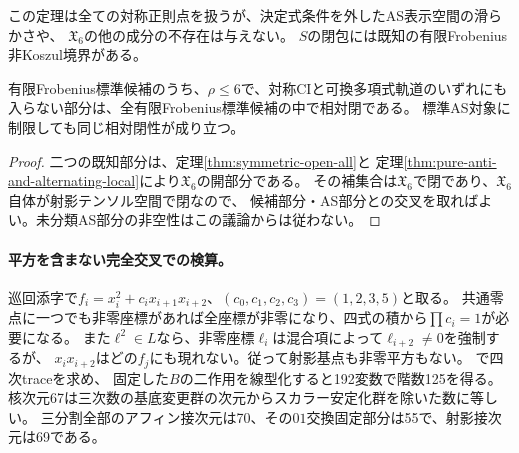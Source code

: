 この定理は全ての対称正則点を扱うが、決定式条件を外したAS表示空間の滑らかさや、
$\mathfrak X_6$の他の成分の不存在は与えない。
$S$の閉包には既知の有限Frobenius非Koszul境界がある。

\begin{corollary}[未分類低階数部分の特殊化]\label{cor:closed-low-residual}
有限Frobenius標準候補のうち、$\rho\leq6$で、対称CIと可換多項式軌道のいずれにも
入らない部分は、全有限Frobenius標準候補の中で相対閉である。
標準AS対象に制限しても同じ相対閉性が成り立つ。
\end{corollary}
\begin{proof}
二つの既知部分は、定理\ref{thm:symmetric-open-all}と
定理\ref{thm:pure-anti-and-alternating-local}により$\mathfrak X_6$の開部分である。
その補集合は$\mathfrak X_6$で閉であり、$\mathfrak X_6$自体が射影テンソル空間で閉なので、
候補部分・AS部分との交叉を取ればよい。未分類AS部分の非空性はこの議論からは従わない。
\end{proof}

\paragraph{平方を含まない完全交叉での検算。}
巡回添字で$f_i=x_i^2+c_ix_{i+1}x_{i+2}$、$(c_0,c_1,c_2,c_3)=(1,2,3,5)$と取る。
共通零点に一つでも非零座標があれば全座標が非零になり、四式の積から$\prod c_i=1$が必要になる。
また$\ell^2\in L$なら、非零座標$\ell_i$は混合項によって$\ell_{i+2}\ne0$を強制するが、
$x_ix_{i+2}$はどの$f_j$にも現れない。従って射影基点も非零平方もない。
で四次traceを求め、
固定した$B$の二作用を線型化すると192変数で階数125を得る。
核次元67は三次数の基底変更群の次元からスカラー安定化群を除いた数に等しい。
三分割全部のアフィン接次元は70、その$01$交換固定部分は55で、射影接次元は69である。
